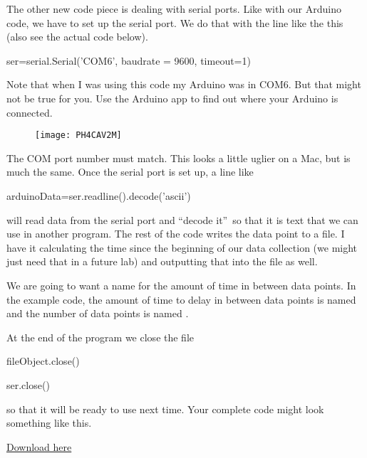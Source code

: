 The other new code piece is dealing with serial ports. Like with our Arduino
code, we have to set up the serial port. We do that with the line like the
this (also see the actual code below).
\begin{python}
	ser=serial.Serial('COM6', baudrate = 9600, timeout=1)
\end{python}
Note that when I was using this code my Arduino was in COM6. But that might
not be true for you. Use the Arduino app to find out where your Arduino is
connected. \begin{figure}[h!]
\texttt{[image: PH4CAV2M]}
\end{figure}

The COM port number must match. This looks a little uglier on a Mac, but is
much the same. Once the serial port is set up, a line like

\begin{python}
	arduinoData=ser.readline().decode('ascii')
\end{python}
will read data from the serial port and \textquotedblleft decode
it\textquotedblright\ so that it is text that we can use in another program.
The rest of the code writes the data point to a file. I have it calculating
the time since the beginning of our data collection (we might just need that
in a future lab) and outputting that into the file as well.

We are going to want a name for the amount of time in between data points.
In the example code, the amount of time to delay in between data points is
named  and the number of data points is named .

At the end of the program we close the file

\begin{python}
	fileObject.close()
\end{python}

\begin{python}
	ser.close()
\end{python}

so that it will be ready to use next time. Your complete code might look
something like this.

\href{https://dtoliphant.github.io/PH250Manual/Code/Data2Computer_PythonSide_Win.py}{Download here}

